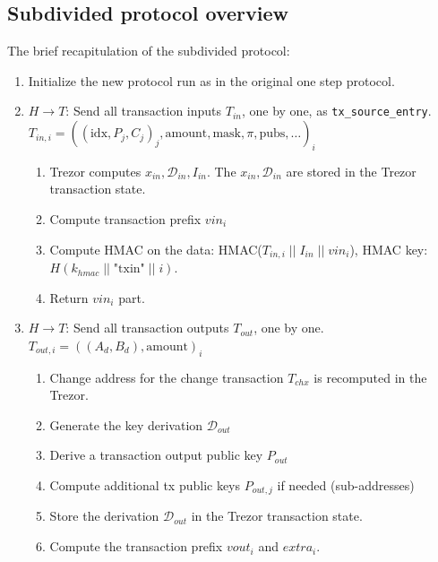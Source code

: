 \documentclass[]{article}
\begin{document}
\subsection{Subdivided protocol overview}

The brief recapitulation of the subdivided protocol:

\begin{enumerate}
	\item Initialize the new protocol run as in the original one step protocol.
	\item $H \rightarrow T$: Send all transaction inputs $T_{in}$, one by one, as \verb|tx_source_entry|.\\
	$T_{in,i} = ((\text{idx}, P_j,C_j)_j, \text{amount}, \text{mask}, \pi, \text{pubs}, \dots)_i$
	\begin{enumerate}
		\item Trezor computes $x_{in}, \mathcal{D}_{in}, I_{in}$. The $x_{in}, \mathcal{D}_{in}$ are stored in the Trezor transaction state.
		
		\item Compute transaction prefix $vin_i$
		
		\item Compute HMAC on the data: HMAC($T_{in,i} \; || \; I_{in} \; || \; vin_i$), HMAC key: $H(k_{hmac} \; || \; \text{"txin"} \; || \; i)$.
		
		\item Return $vin_i$ part.
	\end{enumerate} 
	
	\item $H \rightarrow T$: Send all transaction outputs $T_{out}$, one by one. $T_{out,i} = ((A_d, B_d), \text{amount})_i$
	\begin{enumerate}
		\item Change address for the change transaction $T_{chx}$ is recomputed in the Trezor.
				
		\item Generate the key derivation $\mathcal{D}_{out}$
		\item Derive a transaction output public key $P_{out}$
		\item Compute additional tx public keys $P_{out,j}$ if needed (sub-addresses)
		
        \item Store the derivation $\mathcal{D}_{out}$ in the Trezor transaction state.
        
        \item Compute the transaction prefix $vout_i$ and $extra_i$.
        

\end{enumerate}
\end{enumerate}
\end{document}
